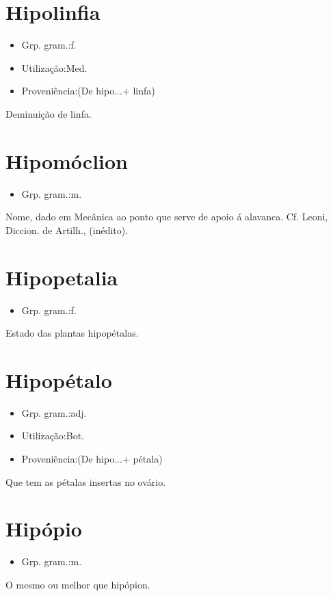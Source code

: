 \documentclass{article}
\begin{document}
\section{Hipolinfia}
\begin{itemize}
\item {Grp. gram.:f.}
\end{itemize}
\begin{itemize}
\item {Utilização:Med.}
\end{itemize}
\begin{itemize}
\item {Proveniência:(De \textunderscore hipo...\textunderscore  + \textunderscore linfa\textunderscore )}
\end{itemize}
Deminuição de linfa.
\section{Hipomóclion}
\begin{itemize}
\item {Grp. gram.:m.}
\end{itemize}
Nome, dado em Mecânica ao ponto que serve de apoio á alavanca. Cf. Leoni, \textunderscore Diccion. de Artilh.\textunderscore , (inédito).
\section{Hipopetalia}
\begin{itemize}
\item {Grp. gram.:f.}
\end{itemize}
Estado das plantas hipopétalas.
\section{Hipopétalo}
\begin{itemize}
\item {Grp. gram.:adj.}
\end{itemize}
\begin{itemize}
\item {Utilização:Bot.}
\end{itemize}
\begin{itemize}
\item {Proveniência:(De \textunderscore hipo...\textunderscore  + \textunderscore pétala\textunderscore )}
\end{itemize}
Que tem as pétalas insertas no ovário.
\section{Hipópio}
\begin{itemize}
\item {Grp. gram.:m.}
\end{itemize}
O mesmo ou melhor que \textunderscore hipópion\textunderscore .
\end{document}
